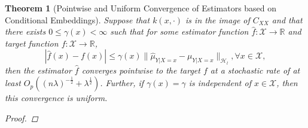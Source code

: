 \documentclass{article}
\newtheorem{theorem}{Theorem}[section]
\begin{document}
	\begin{theorem}[Pointwise and Uniform Convergence of Estimators based on Conditional Embeddings]
		\label{thm:pointwise_uniform_convergence}
		Suppose that $k(x, \cdot)$ is in the image of $C_{XX}$ and that there exists $0 \leq \gamma(x) < \infty$ such that for some estimator function $\hat{f} : \mathcal{X} \to \mathbb{R}$ and target function  $f : \mathcal{X} \to \mathbb{R}$,
		\begin{equation}
			| \hat{f}(x) - f(x) | \leq \gamma(x) \big\| \hat{\mu}_{Y | X = x} - \mu_{Y | X = x} \big\|_{\mathcal{H}_{l}}, \forall x \in \mathcal{X},
		\label{eq:estimator_error_bound}
		\end{equation}
		then the estimator $\hat{f}$ converges pointwise to the target $f$ at a stochastic rate of at least $O_{p}((n \lambda)^{-\frac{1}{2}} + \lambda^{\frac{1}{2}})$. Further, if $\gamma(x) = \gamma$ is independent of $x \in \mathcal{X}$, then this convergence is uniform.
		
		\begin{proof}
			

\end{proof}
\end{theorem}
\end{document}
